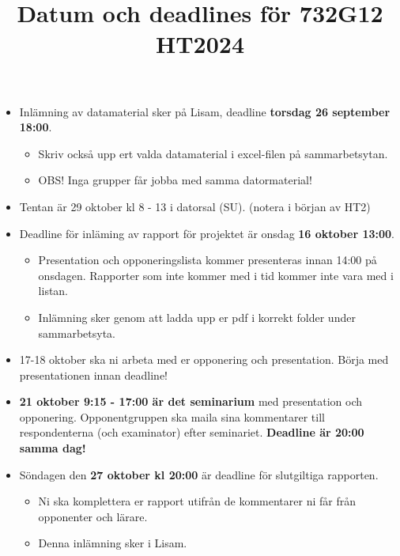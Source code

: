 \documentclass[a4paper]{article}
\title{Datum och deadlines för 732G12 HT2024}
\author{}
\date{}
\begin{document}
\maketitle
\thispagestyle{fancy}

\begin{itemize}
    \item Inlämning av datamaterial sker på Lisam, deadline \textbf{torsdag 26 september 18:00}.
    \begin{itemize}
        \item Skriv också upp ert valda datamaterial i excel-filen på sammarbetsytan.
        \item OBS! Inga grupper får jobba med samma datormaterial!
    \end{itemize}
    \item Tentan är 29 oktober kl 8 - 13 i datorsal (SU). (notera i början av HT2)
    \item Deadline för inläming av rapport för projektet är onsdag \textbf{16 oktober 13:00}.
    \begin{itemize}
        \item Presentation och opponeringslista kommer presenteras innan 14:00 på onsdagen. Rapporter som inte kommer med i tid kommer inte vara med i listan.
        \item Inlämning sker genom att ladda upp er pdf i korrekt folder under sammarbetsyta.
    \end{itemize}
    \item 17-18 oktober ska ni arbeta med er opponering och presentation. Börja med presentationen innan deadline!
    \item \textbf{21 oktober 9:15 - 17:00 är det seminarium} med presentation och opponering. Opponentgruppen ska maila sina kommentarer till respondenterna (och examinator) efter seminariet. \textbf{Deadline är 20:00 samma dag!}
    \item Söndagen den \textbf{27 oktober kl 20:00} är deadline för slutgiltiga rapporten.
    \begin{itemize}
        \item Ni ska komplettera er rapport utifrån de kommentarer ni får från opponenter och lärare.
        \item Denna inlämning sker i Lisam.
    \end{itemize}
\end{itemize}
\end{document}
